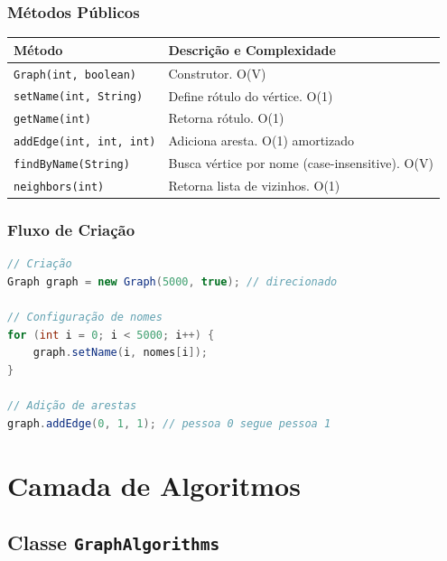 \documentclass[12pt,a4paper]{article}
\begin{document}
\subsubsection{Métodos Públicos}

\begin{table}[h]
\centering
\begin{tabular}{|l|l|}
\hline
\textbf{Método} & \textbf{Descrição e Complexidade} \\
\hline
\texttt{Graph(int, boolean)} & Construtor. O(V) \\
\hline
\texttt{setName(int, String)} & Define rótulo do vértice. O(1) \\
\hline
\texttt{getName(int)} & Retorna rótulo. O(1) \\
\hline
\texttt{addEdge(int, int, int)} & Adiciona aresta. O(1) amortizado \\
\hline
\texttt{findByName(String)} & Busca vértice por nome (case-insensitive). O(V) \\
\hline
\texttt{neighbors(int)} & Retorna lista de vizinhos. O(1) \\
\hline
\end{tabular}
\end{table}

\subsubsection{Fluxo de Criação}

\begin{lstlisting}[language=Java, caption=Uso da classe Graph]
// Criação
Graph graph = new Graph(5000, true); // direcionado

// Configuração de nomes
for (int i = 0; i < 5000; i++) {
    graph.setName(i, nomes[i]);
}

// Adição de arestas
graph.addEdge(0, 1, 1); // pessoa 0 segue pessoa 1
\end{lstlisting}

\newpage

\section{Camada de Algoritmos}

\subsection{Classe \texttt{GraphAlgorithms}}
\end{document}
